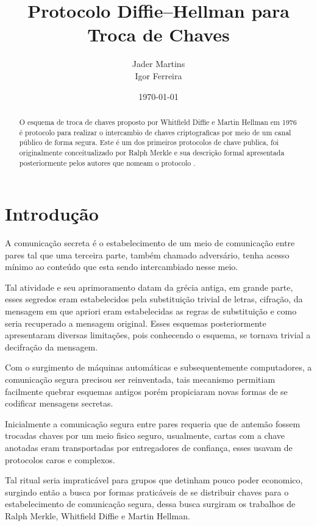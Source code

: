 \documentclass{article}
\title{Protocolo Diffie–Hellman para Troca de Chaves}
\author{Jader Martins\\
        Igor Ferreira}
\date{\today}
\begin{document}
\maketitle

\begin{abstract}
    O esquema de troca de chaves proposto por Whitfield Diffie e
    Martin Hellman em 1976 é protocolo para realizar
    o intercambio de chaves criptograficas por meio de um canal público
    de forma segura\cite{Diffie}. Este é um dos primeiros protocolos de
    chave publica, foi originalmente conceitualizado por Ralph Merkle
    e sua descrição formal apresentada posteriormente pelos autores que
    nomeam o protocolo \cite{Merkle}.
\end{abstract}

\section{Introdução}%
\label{sec:introducao}
A comunicação secreta é o estabelecimento de um meio de comunicação entre pares
tal que uma terceira parte, também chamado adversário, tenha acesso mínimo ao
conteúdo que esta sendo intercambiado nesse meio.

Tal atividade e seu aprimoramento datam da grécia
antiga\cite{katz2014introduction}, em grande parte, esses segredos eram
estabelecidos pela substituição trivial de letras, cifração, da mensagem em que
apriori eram estabelecidas as regras de substituição e como seria recuperado a
mensagem original. Esses esquemas posteriormente apresentaram diversas
limitações, pois conhecendo o esquema, se tornava trivial a decifração da
mensagem.

Com o surgimento de máquinas automáticas e subsequentemente computadores, a
comunicação segura precisou ser reinventada\cite{singh1999code}, tais mecanismo
permitiam facilmente quebrar esquemas antigos porém propiciaram novas formas de
se codificar mensagens secretas\cite{Diffie}.


Inicialmente a comunicação segura entre pares requeria que de antemão fossem
trocadas chaves por um meio fisico seguro, usualmente, cartas com a chave
anotadas eram transportadas por entregadores de confiança, esses usavam de
protocolos caros e complexos\cite{matsumoto1987key,Merkle}.

Tal ritual seria impraticável para grupos que detinham pouco poder economico,
surgindo então a busca por formas praticáveis de se distribuir chaves para o
estabelecimento de comunicação segura, dessa busca surgiram os trabalhos de
Ralph Merkle, Whitfield Diffie e Martin Hellman.
\end{document}
